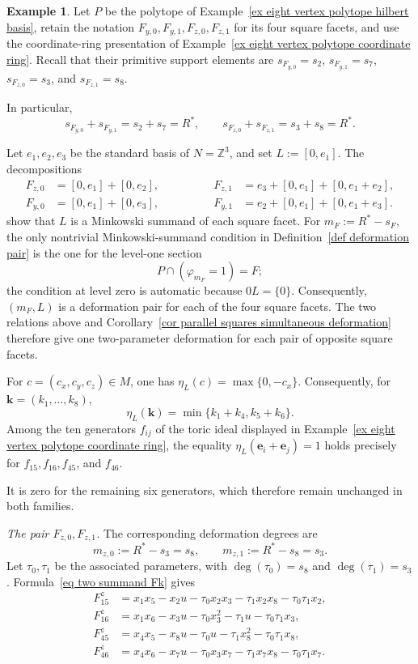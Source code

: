 \documentclass[11pt]{amsart}
\numberwithin{equation}{section}
\theoremstyle{plain}
\theoremstyle{definition}
\newtheorem{example}[theorem]{Example}
\newcommand{\0}{$0$-mutable}
\newcommand{\ZZ}{\ensuremath{\mathbb{Z}}}
\newcommand{\bfk}{\ensuremath{\mathbf{k}}}
\renewcommand{\1}{$1$-rigid}
\renewcommand{\0}{$0$-mutable}
\begin{document}
\begin{example}\label{ex eight vertex two parameter deformations}
Let \(P\) be the polytope of
Example~\ref{ex eight vertex polytope hilbert basis}, retain the notation
\(F_{y,0},F_{y,1},F_{z,0},F_{z,1}\) for its four square facets, and use
the coordinate-ring presentation of
Example~\ref{ex eight vertex polytope coordinate ring}. Recall that
their primitive support elements are
\(s_{F_{y,0}}=s_2\), \(s_{F_{y,1}}=s_7\),
\(s_{F_{z,0}}=s_3\), and \(s_{F_{z,1}}=s_8\).

In particular,
\[
s_{F_{y,0}}+s_{F_{y,1}}=s_2+s_7=R^*,
\qquad
s_{F_{z,0}}+s_{F_{z,1}}=s_3+s_8=R^*.
\]

Let \(e_1,e_2,e_3\) be the standard basis of \(N=\ZZ^3\), and set
\(L:=[0,e_1]\). The decompositions
\[
\begin{alignedat}{2}
F_{z,0}&=[0,e_1]+[0,e_2],
&\qquad\qquad
F_{z,1}&=e_3+[0,e_1]+[0,e_1+e_2],
\\
F_{y,0}&=[0,e_1]+[0,e_3],
&\qquad\qquad
F_{y,1}&=e_2+[0,e_1]+[0,e_1+e_3].
\end{alignedat}
\]
show that \(L\) is a Minkowski summand of each square facet. For
\(m_F:=R^*-s_F\), the only nontrivial Minkowski-summand condition in
Definition~\ref{def deformation pair} is the one for the level-one
section
\[
P\cap(\varphi_{m_F}=1)=F;
\]
the condition at level zero is automatic because \(0L=\{0\}\).
Consequently, \((m_F,L)\) is a deformation pair for each of the four
square facets. The two relations above and
Corollary~\ref{cor parallel squares simultaneous deformation} therefore
give one two-parameter deformation for each pair of opposite square
facets.

For \(c=(c_x,c_y,c_z)\in M\), one has
\(\eta_L(c)=\max\{0,-c_x\}\). Consequently, for
\(\bfk=(k_1,\ldots,k_8)\),
\begin{equation}\label{eq eta L eight vertex}
\eta_L(\bfk)
=
\min\{k_1+k_4,k_5+k_6\}.
\end{equation}
Among the ten generators \(f_{ij}\) of the toric ideal displayed in
Example~\ref{ex eight vertex polytope coordinate ring}, the equality
\(\eta_L(\mathbf e_i+\mathbf e_j)=1\) holds precisely for
\(f_{15}, f_{16}, f_{45}\), and \(f_{46}\).

It is zero for the remaining six generators, which therefore remain
unchanged in both families.

\smallskip
\noindent\emph{The pair \(F_{z,0},F_{z,1}\).}
The corresponding deformation degrees are
\[
m_{z,0}:=R^*-s_3=s_8,
\qquad
m_{z,1}:=R^*-s_8=s_3.
\]
Let \(\tau_0,\tau_1\) be the associated parameters, with
\(\deg(\tau_0)=s_8\) and \(\deg(\tau_1)=s_3\).
Formula~\eqref{eq two summand Fk} gives
\[
\begin{aligned}
F^{z}_{15}
&=x_1x_5-x_2u-\tau_0x_2x_3-\tau_1x_2x_8-\tau_0\tau_1x_2,
\\
F^{z}_{16}
&=x_1x_6-x_3u-\tau_0x_3^2-\tau_1u-\tau_0\tau_1x_3,
\\
F^{z}_{45}
&=x_4x_5-x_8u-\tau_0u-\tau_1x_8^2-\tau_0\tau_1x_8,
\\
F^{z}_{46}
&=x_4x_6-x_7u-\tau_0x_3x_7-\tau_1x_7x_8-\tau_0\tau_1x_7.
\end{aligned}
\]


\end{example}
\end{document}
